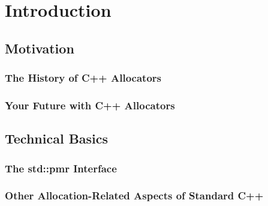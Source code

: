\chapter{Introduction}

\section{Motivation}

\subsection{The History of C++ Allocators}

\subsection{Your Future with C++ Allocators}

\section{Technical Basics}

\subsection{The std::pmr Interface}

\subsection{Other Allocation-Related Aspects of Standard C++}

